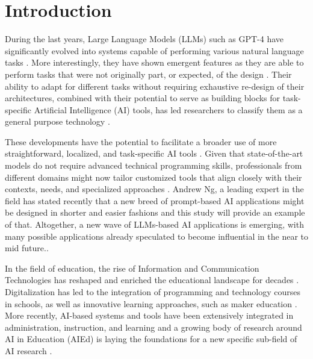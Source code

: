 \documentclass[sn-mathphys, Numbered]{sn-jnl}%
\theoremstyle{thmstyleone}%
\theoremstyle{thmstyletwo}%
\theoremstyle{thmstylethree}%
\begin{document}

\maketitle

\section{Introduction}\label{Introduction}
During the last years, Large Language Models (LLMs) such as GPT-4 have significantly evolved into systems capable of performing various natural language tasks \parencite{brown_language_2020}. More interestingly, they have shown emergent features as they are able to perform tasks that were not originally part, or expected, of the design \parencite{wei_emergent_2022}. Their ability to adapt for different tasks without requiring exhaustive re-design of their architectures, combined with their potential to serve as building blocks for task-specific Artificial Intelligence (AI) tools, has led researchers to classify them as a general purpose technology \parencite{eloundou_gpts_2023}. 

These developments have the potential to facilitate a broader use of more straightforward, localized, and task-specific AI tools \parencite{bubeck_sparks_2023}. Given that state-of-the-art models do not require advanced technical programming skills, professionals from different domains might now tailor customized tools that align closely with their contexts, needs, and specialized approaches \parencite{cain_gpteammate_2023}. Andrew Ng, a leading expert in the field has stated recently that a new breed of prompt-based AI applications might be designed in shorter and easier fashions \parencite{YouTube_2023} and this study will provide an example of that. Altogether, a new wave of LLMs-based AI applications is emerging, with many possible applications already speculated to become influential in the near to mid future.\parencite{bommasani_opportunities_2022}.

In the field of education, the rise of Information and Communication Technologies has reshaped and enriched the educational landscape for decades \parencite{higgins_impact_2012}. Digitalization has led to the integration of programming and technology courses in schools, as well as innovative learning approaches, such as maker education \parencite{blikstein2013digital}. More recently, AI-based systems and tools have been extensively integrated in administration, instruction, and learning \parencite{chen_application_2020} and a growing body of research around AI in Education (AIEd) is laying the foundations for a new specific sub-field of AI research \parencite{niemi_ai_2023}. 
\end{document}
